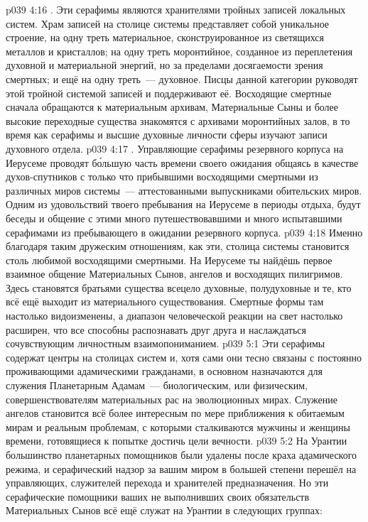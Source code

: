 \vs p039 4:16 . Эти серафимы являются хранителями тройных записей локальных систем. Храм записей на столице системы представляет собой уникальное строение, на одну треть материальное, сконструированное из светящихся металлов и кристаллов; на одну треть моронтийное, созданное из переплетения духовной и материальной энергий, но за пределами досягаемости зрения смертных; и ещё на одну треть~--- духовное. Писцы данной категории руководят этой тройной системой записей и поддерживают её. Восходящие смертные сначала обращаются к материальным архивам, Материальные Сыны и более высокие переходные существа знакомятся с архивами моронтийных залов, в то время как серафимы и высшие духовные личности сферы изучают записи духовного отдела.
\vs p039 4:17 . Управляющие серафимы резервного корпуса на Иерусеме проводят б\'ольшую часть времени своего ожидания общаясь в качестве духов\hyp{}спутников с только что прибывшими восходящими смертными из различных миров системы~--- аттестованными выпускниками обительских миров. Одним из удовольствий твоего пребывания на Иерусеме в периоды отдыха, будут беседы и общение с этими много путешествовавшими и много испытавшими серафимами из пребывающего в ожидании резервного корпуса.
\vs p039 4:18 Именно благодаря таким дружеским отношениям, как эти, столица системы становится столь любимой восходящими смертными. На Иерусеме ты найдёшь первое взаимное общение Материальных Сынов, ангелов и восходящих пилигримов. Здесь становятся братьями существа всецело духовные, полудуховные и те, кто всё ещё выходит из материального существования. Смертные формы там настолько видоизменены, а диапазон человеческой реакции на свет настолько расширен, что все способны распознавать друг друга и наслаждаться сочувствующим личностным взаимопониманием.
\vs p039 5:1 Эти серафимы содержат центры на столицах систем и, хотя сами они тесно связаны с постоянно проживающими адамическими гражданами, в основном назначаются для служения Планетарным Адамам~--- биологическим, или физическим, совершенствователям материальных рас на эволюционных мирах. Служение ангелов становится всё более интересным по мере приближения к обитаемым мирам и реальным проблемам, с которыми сталкиваются мужчины и женщины времени, готовящиеся к попытке достичь цели вечности.
\vs p039 5:2 На Урантии большинство планетарных помощников были удалены после краха адамического режима, и серафический надзор за вашим миром в большей степени перешёл на управляющих, служителей перехода и хранителей предназначения. Но эти серафические помощники ваших не выполнивших своих обязательств Материальных Сынов всё ещё служат на Урантии в следующих группах:
